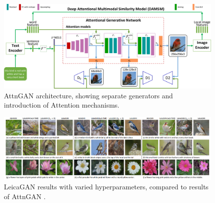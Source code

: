 \documentclass[letterpaper]{article} %
\begin{document}
\begin{figure}[htbp]
	\centerline{\includegraphics[width=\linewidth]{attngan.png}}
	\caption{AttnGAN architecture, showing separate generators and introduction 
		of Attention mechanisms.}
	\label{fig:attngan}
\end{figure}

\begin{figure}[htbp]
	\centerline{\includegraphics[width=\linewidth]{leicagan.png}}
	\caption{LeicaGAN results with varied hyperparameters, compared to results 
		of AttnGAN
		\cite{leica}.}
	\label{fig:leicagan}
\end{figure}



\end{document}
